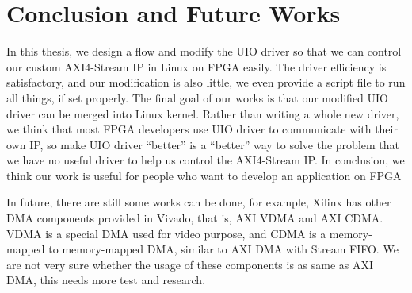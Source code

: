 \chapter{Conclusion and Future Works}
\label{cha:conclusion and Future Works}

In this thesis, we design a flow and modify the UIO driver so that we can control our custom AXI4-Stream IP in Linux on FPGA easily. The driver efficiency is satisfactory, and our modification is also little, we even provide a script file to run all things, if set properly. The final goal of our works is that our modified UIO driver can be merged into Linux kernel. Rather than writing a whole new driver, we think that most FPGA developers use UIO driver to communicate with their own IP, so make UIO driver ``better'' is a ``better'' way to solve the problem that we have no useful driver to help us control the AXI4-Stream IP. In conclusion, we think our work is useful for people who want to develop an application on FPGA

In future, there are still some works can be done, for example, Xilinx has other DMA components provided in Vivado, that is, AXI VDMA and AXI CDMA. VDMA is a special DMA used for video purpose, and CDMA is a memory-mapped to memory-mapped DMA, similar to AXI DMA with Stream FIFO. We are not very sure whether the usage of these components is as same as AXI DMA, this needs more test and research. 





